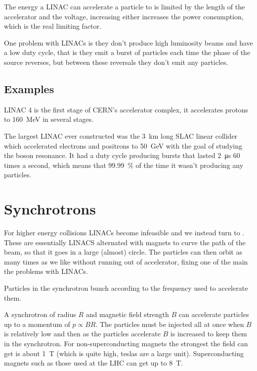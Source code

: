 \documentclass[fleqn]{NotesClass}
\begin{document}
    The energy a LINAC can accelerate a particle to is limited by the length of the accelerator and the voltage, increasing either increases the power consumption, which is the real limiting factor.
    
    One problem with LINACs is they don't produce high luminosity beams and have a low duty cycle, that is they emit a burst of particles each time the phase of the source reverses, but between these reversals they don't emit any particles.
    
    \subsection{Examples}
    LINAC 4 is the first stage of CERN's accelerator complex, it accelerates protons to \qty{160}{\mega\electronvolt} in several stages.
    
    The largest LINAC ever constructed was the \qty{3}{\kilo\metre} long SLAC linear collider which accelerated electrons and positrons to \qty{50}{\giga\electronvolt} with the goal of studying the \PZ{} boson resonance.
    It had a duty cycle producing bursts that lasted \qty{2}{\micro\second} 60 times a second, which means that \qty{99.99}{\percent} of the time it wasn't producing any particles.
    
    \section{Synchrotrons}
    For higher energy collisions LINACs become infeasible and we instead turn to .
    These are essentially LINACS alternated with magnets to curve the path of the beam, so that it goes in a large (almost) circle.
    The particles can then orbit as many times as we like without running out of accelerator, fixing one of the main the problems with LINACs.
    
    Particles in the synchrotron bunch according to the frequency used to accelerate them.
    
    A synchrotron of radius \(R\) and magnetic field strength \(B\) can accelerate particles up to a momentum of \(p \propto BR\).
    The particles must be injected all at once when \(B\) is relatively low and then as the particles accelerate \(B\) is increased to keep them in the synchrotron.
    For non-superconducting magnets the strongest the field can get is about \qty{1}{\tesla} (which is quite high, teslas are a large unit).
    Superconducting magnets such as those used at the LHC can get up to \qty{8}{\tesla}.
    
\end{document}
